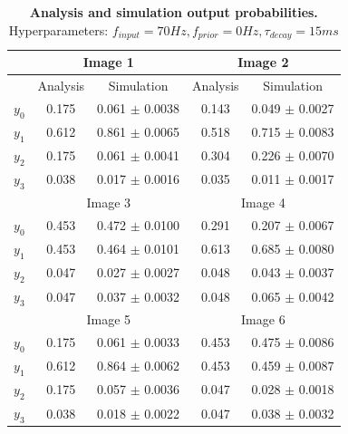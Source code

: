 \begin{table}[]
\centering
\label{tab:1D_70_0_15}
\small
\tabcolsep=0.11cm
\begin{tabular}{|c|cc|cc|}
\hline
                       & \multicolumn{2}{c|}{Image 1}                       & \multicolumn{2}{c|}{Image 2}                       \\ \hline
                       & \multicolumn{1}{c|}{Analysis} & Simulation         & \multicolumn{1}{c|}{Analysis} & Simulation         \\ \hline
$y_0$                  & \multicolumn{1}{c|}{0.175}    & 0.061 $\pm$ 0.0038 & \multicolumn{1}{c|}{0.143}    & 0.049 $\pm$ 0.0027 \\ \hline
$y_1$                  & \multicolumn{1}{c|}{0.612}    & 0.861 $\pm$ 0.0065 & \multicolumn{1}{c|}{0.518}    & 0.715 $\pm$ 0.0083 \\ \hline
$y_2$                  & \multicolumn{1}{c|}{0.175}    & 0.061 $\pm$ 0.0041 & \multicolumn{1}{c|}{0.304}    & 0.226 $\pm$ 0.0070 \\ \hline
$y_3$                  & \multicolumn{1}{c|}{0.038}    & 0.017 $\pm$ 0.0016 & \multicolumn{1}{c|}{0.035}    & 0.011 $\pm$ 0.0017 \\ \hline
                       & \multicolumn{2}{c|}{Image 3}                       & \multicolumn{2}{c|}{Image 4}                       \\ \hline
$y_0$                  & \multicolumn{1}{c|}{0.453}    & 0.472 $\pm$ 0.0100 & \multicolumn{1}{c|}{0.291}    & 0.207 $\pm$ 0.0067 \\ \hline
$y_1$                  & \multicolumn{1}{c|}{0.453}    & 0.464 $\pm$ 0.0101 & \multicolumn{1}{c|}{0.613}    & 0.685 $\pm$ 0.0080 \\ \hline
$y_2$                  & \multicolumn{1}{c|}{0.047}    & 0.027 $\pm$ 0.0027 & \multicolumn{1}{c|}{0.048}    & 0.043 $\pm$ 0.0037 \\ \hline
$y_3$                  & \multicolumn{1}{c|}{0.047}    & 0.037 $\pm$ 0.0032 & \multicolumn{1}{c|}{0.048}    & 0.065 $\pm$ 0.0042 \\ \hline
						& \multicolumn{2}{c|}{Image 5}                       & \multicolumn{2}{c|}{Image 6}                       \\ \hline
$y_0$                  & \multicolumn{1}{c|}{0.175}    & 0.061 $\pm$ 0.0033 & \multicolumn{1}{c|}{0.453}    & 0.475 $\pm$ 0.0086 \\ \hline
$y_1$                  & \multicolumn{1}{c|}{0.612}    & 0.864 $\pm$ 0.0062 & \multicolumn{1}{c|}{0.453}    & 0.459 $\pm$ 0.0087 \\ \hline
$y_2$                  & \multicolumn{1}{c|}{0.175}    & 0.057 $\pm$ 0.0036 & \multicolumn{1}{c|}{0.047}    & 0.028 $\pm$ 0.0018 \\ \hline
$y_3$                  & \multicolumn{1}{c|}{0.038}    & 0.018 $\pm$ 0.0022 & \multicolumn{1}{c|}{0.047}    & 0.038 $\pm$ 0.0032 \\ \hline
\end{tabular}
\caption{\textbf{Analysis and simulation output probabilities. } Hyperparameters: $f_{input} = 70 Hz, f_{prior} = 0 Hz, \tau_{decay} = 15 ms$}
\end{table}

